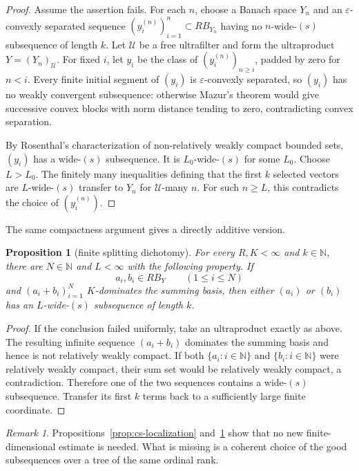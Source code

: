 \documentclass[11pt]{article}
\newtheorem{proposition}[theorem]{Proposition}
\theoremstyle{definition}
\theoremstyle{remark}
\newtheorem{remark}[theorem]{Remark}
\newcommand{\eps}{\varepsilon}
\newcommand{\N}{\mathbb N}
\begin{document}
\begin{proof}
Assume the assertion fails.  For each $n$, choose a Banach space $Y_n$ and an $\eps$-convexly separated sequence $(y_i^{(n)})_{i=1}^n\subset R B_{Y_n}$ having no $n$-wide-$(s)$ subsequence of length $k$.  Let $\mathcal U$ be a free ultrafilter and form the ultraproduct $Y=(Y_n)_\mathcal U$.  For fixed $i$, let $y_i$ be the class of $(y_i^{(n)})_{n\geq i}$, padded by zero for $n<i$.  Every finite initial segment of $(y_i)$ is $\eps$-convexly separated, so $(y_i)$ has no weakly convergent subsequence: otherwise Mazur's theorem would give successive convex blocks with norm distance tending to zero, contradicting convex separation.

By Rosenthal's characterization of non-relatively weakly compact bounded sets, $(y_i)$ has a wide-$(s)$ subsequence.  It is $L_0$-wide-$(s)$ for some $L_0$.  Choose $L>L_0$.  The finitely many inequalities defining that the first $k$ selected vectors are $L$-wide-$(s)$ transfer to $Y_n$ for $\mathcal U$-many $n$.  For such $n\geq L$, this contradicts the choice of $(y_i^{(n)})$.
\end{proof}

The same compactness argument gives a directly additive version.

\begin{proposition}[finite splitting dichotomy]\label{prop:finite-split}
For every $R,K<\infty$ and $k\in\N$, there are $N\in\N$ and $L<\infty$ with the following property.  If
\[
   a_i,b_i\in R B_Y\qquad(1\leq i\leq N)
\]
and $(a_i+b_i)_{i=1}^N$ $K$-dominates the summing basis, then either $(a_i)$ or $(b_i)$ has an $L$-wide-$(s)$ subsequence of length $k$.
\end{proposition}

\begin{proof}
If the conclusion failed uniformly, take an ultraproduct exactly as above.  The resulting infinite sequence $(a_i+b_i)$ dominates the summing basis and hence is not relatively weakly compact.  If both $\{a_i:i\in\N\}$ and $\{b_i:i\in\N\}$ were relatively weakly compact, their sum set would be relatively weakly compact, a contradiction.  Therefore one of the two sequences contains a wide-$(s)$ subsequence.  Transfer its first $k$ terms back to a sufficiently large finite coordinate.
\end{proof}

\begin{remark}
Propositions~\ref{prop:cs-localization} and~\ref{prop:finite-split} show that no new finite-dimensional estimate is needed.  What is missing is a coherent choice of the good subsequences over a tree of the same ordinal rank.
\end{remark}
\end{document}
